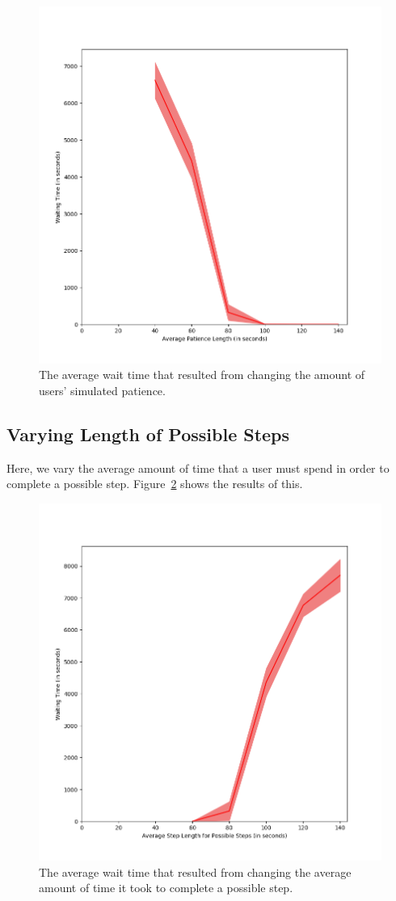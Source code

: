 \begin{figure}[H]
  \includegraphics[width=\textwidth]{figures/montecarlo/vary_patience.png}
  \caption{
    The average wait time that resulted from changing the amount of users'
    simulated patience.
  }\label{fig:vary_patience}
\end{figure}

\subsection{Varying Length of Possible Steps}

Here, we vary the average amount of time that a user must spend in order to
complete a possible step. Figure~\ref{fig:vary_step_length} shows the results of
this.

\begin{figure}[H]
  \includegraphics[width=\textwidth]{figures/montecarlo/vary_step_length.png}
  \caption{
    The average wait time that resulted from changing the average amount of time
    it took to complete a possible step.
  }\label{fig:vary_step_length}
\end{figure}
